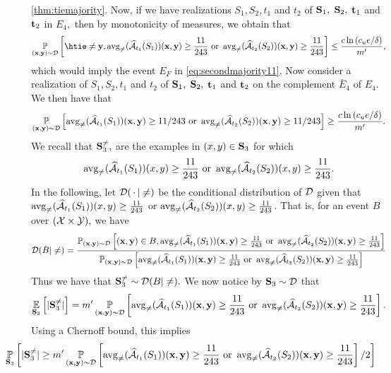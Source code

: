 \begin{proofof}{\cref{thm:tiemajority}.}
Now, if we have realizations $ S_{1},S_{2},t_{1} $ and $ t_{2} $ of $ \mathbf{S}_{1},$ $ \mathbf{S}_{2},$ $ \mathbf{t}_{1} $ and $ \mathbf{t}_{2} $ in $ E_{4},$ then by monotonicity of measures, we obtain that
\begin{align*}
    \p_{(\rx,\ry)\sim\cD}\left[\htie\not=\ry,  \avg(\widehat{\cA}_{t_{1}}(S_{1}))(\rx,\ry)\geq \frac{11}{243} \text{ or } \avg(\widehat{\cA}_{t_{2}}(S_{2}))(\rx,\ry)\geq \frac{11}{243}\right]\leq \frac{c\ln{\left(\cu e/\delta \right)}}{m'},
\end{align*}
which would imply the event $ E_{F} $ in \cref{eq:secondmajority11}.
Now consider a realization of $ S_{1},S_{2},t_{1} $ and $ t_{2} $ of $ \mathbf{S}_{1},$ $ \mathbf{S}_{2},$ $ \mathbf{t}_{1} $ and $ \mathbf{t}_{2} $ on the complement $ \bar{E}_{4} $ of $ E_{4}.$ 
We then have that 
\[ \operatorname*{\mathbb{P}}_{(\mathbf{x},\mathbf{y})\sim\mathcal{D}}\left[ \operatorname{\mathrm{avg}_{\not=}}(\widehat{\mathcal{A}}_{t_{1}}(S_{1}))(\mathbf{x},\mathbf{y})\geq 11/243 \text{ or } \operatorname{\mathrm{avg}_{\not=}}(\widehat{\mathcal{A}}_{t_{2}}(S_{2}))(\mathbf{x},\mathbf{y})\geq 11/243\right] \geq \frac{c\ln{\left(c_{u}e/\delta \right)}}{m'}. \] 
We recall that $ \mathbf{S}_{3}^{\not=},$ are the examples in $(x,y)\in \mathbf{S}_{3}$ for which  
\[ \operatorname{\mathrm{avg}_{\not=}}(\widehat{\mathcal{A}}_{t_{1}}(S_{1}))(x,y)\geq \frac{11}{243} \text{ or } \operatorname{\mathrm{avg}_{\not=}}(\widehat{\mathcal{A}}_{t_{2}}(S_{2}))(x,y)\geq \frac{11}{243}. \] 
In the following, let $ \mathcal{D}(\, \cdot \, | \not=) $ be the conditional distribution of $ \mathcal{D} $ given that $\operatorname{\mathrm{avg}_{\not=}}(\widehat{\mathcal{A}}_{t_{1}}(S_{1}))(x,y)\geq \frac{11}{243}$ or $\operatorname{\mathrm{avg}_{\not=}}(\widehat{\mathcal{A}}_{t_{2}}(S_{2}))(x,y)\geq \frac{11}{243}$. That is, for an event $ B $ over $ (\mathcal{X}\times \mathcal{Y}),$ we have
\begin{align*}
  \mathcal{D}(B|\not=)=\frac{\operatorname*{\mathbb{P}}_{(\mathbf{x},\mathbf{y})\sim \mathcal{D}}\left[(\mathbf{x},\mathbf{y})\in B, \operatorname{\mathrm{avg}_{\not=}}(\widehat{\mathcal{A}}_{t_{1}}(S_{1}))(\mathbf{x},\mathbf{y})\geq \frac{11}{243} \text{ or } \operatorname{\mathrm{avg}_{\not=}}(\widehat{\mathcal{A}}_{t_{2}}(S_{2}))(\mathbf{x},\mathbf{y})\geq \frac{11}{243}\right]}{\operatorname*{\mathbb{P}}_{(\mathbf{x},\mathbf{y})\sim \mathcal{D}}\left[ \operatorname{\mathrm{avg}_{\not=}}(\widehat{\mathcal{A}}_{t_{1}}(S_{1}))(\mathbf{x},\mathbf{y})\geq \frac{11}{243} \text{ or } \operatorname{\mathrm{avg}_{\not=}}(\widehat{\mathcal{A}}_{t_{2}}(S_{2}))(\mathbf{x},\mathbf{y})\geq \frac{11}{243}\right]}
\end{align*}     
Thus we have that $ \mathbf{S}_{3}^{\not=}\sim \mathcal{D}(B|\not=).$ 
We now notice by $ \mathbf{S}_{3}\sim \mathcal{D} $ that
\begin{align*}
\operatorname*{\mathbb{E}}_{\mathbf{S}_{3}}\left[|\mathbf{S}_{3}^{\not=}|\right]=m'\operatorname*{\mathbb{P}}_{(\mathbf{x},\mathbf{y})\sim\mathcal{D}}\left[\operatorname{\mathrm{avg}_{\not=}}(\widehat{\mathcal{A}}_{t_{1}}(S_{1}))(\mathbf{x},\mathbf{y})\geq \frac{11}{243} \text{ or } \operatorname{\mathrm{avg}_{\not=}}(\widehat{\mathcal{A}}_{t_{2}}(S_{2}))(\mathbf{x},\mathbf{y})\geq \frac{11}{243}\right].
\end{align*}  
Using a Chernoff bound, this implies 
\begin{align*}
& \hspace{-1cm} \p_{\rS_{3}}\left[|\rS_{3}^{\not=}|\geq m'\p_{(\rx,\ry)\sim\cD}\left[\avg(\widehat{\cA}_{t_{1}}(S_{1}))(\rx,\ry)\geq \frac{11}{243} \text{ or } \avg(\widehat{\cA}_{t_{2}}(S_{2}))(\rx,\ry)\geq \frac{11}{243}\right]/2\right]

\end{align*}
\end{proofof}
